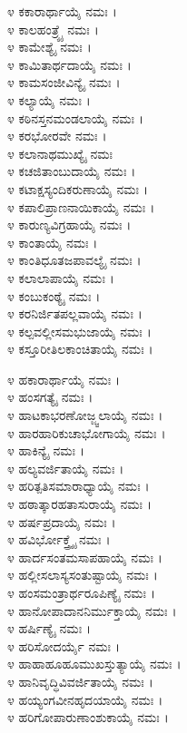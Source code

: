 
೪ ಕಕಾರಾರ್ಥಾಯೈ ನಮಃ ।\\
೪ ಕಾಲಹಂತ್ರ್ಯೈ ನಮಃ ।\\
೪ ಕಾಮೇಶ್ಯೈ ನಮಃ ।\\
೪ ಕಾಮಿತಾರ್ಥದಾಯೈ ನಮಃ ।\\
೪ ಕಾಮಸಂಜೀವಿನ್ಯೈ ನಮಃ ।\\
೪ ಕಲ್ಯಾಯೈ ನಮಃ ।\\
೪ ಕಠಿನಸ್ತನಮಂಡಲಾಯೈ ನಮಃ ।\\
೪ ಕರಭೋರವೇ ನಮಃ ।\\
೪ ಕಲಾನಾಥಮುಖ್ಯೈ ನಮಃ\\
೪ ಕಚಜಿತಾಂಬುದಾಯೈ ನಮಃ ।\\
೪ ಕಟಾಕ್ಷಸ್ಯಂದಿಕರುಣಾಯೈ ನಮಃ ।\\
೪ ಕಪಾಲಿಪ್ರಾಣನಾಯಿಕಾಯೈ ನಮಃ ।\\
೪ ಕಾರುಣ್ಯವಿಗ್ರಹಾಯೈ ನಮಃ ।\\
೪ ಕಾಂತಾಯೈ ನಮಃ ।\\
೪ ಕಾಂತಿಧೂತಜಪಾವಲ್ಯೈ ನಮಃ ।\\
೪ ಕಲಾಲಾಪಾಯೈ ನಮಃ ।\\
೪ ಕಂಬುಕಂಠ್ಯೈ ನಮಃ ।\\
೪ ಕರನಿರ್ಜಿತಪಲ್ಲವಾಯೈ ನಮಃ ।\\
೪ ಕಲ್ಪವಲ್ಲೀಸಮಭುಜಾಯೈ ನಮಃ ।\\
೪ ಕಸ್ತೂರೀತಿಲಕಾಂಚಿತಾಯೈ ನಮಃ ।


೪ ಹಕಾರಾರ್ಥಾಯೈ ನಮಃ ।\\
೪ ಹಂಸಗತ್ಯೈ ನಮಃ ।\\
೪ ಹಾಟಕಾಭರಣೋಜ್ಜ್ವಲಾಯೈ ನಮಃ ।\\
೪ ಹಾರಹಾರಿಕುಚಾಭೋಗಾಯೈ ನಮಃ ।\\
೪ ಹಾಕಿನ್ಯೈ ನಮಃ ।\\
೪ ಹಲ್ಯವರ್ಜಿತಾಯೈ ನಮಃ ।\\
೪ ಹರಿತ್ಪತಿಸಮಾರಾಧ್ಯಾಯೈ ನಮಃ ।\\
೪ ಹಠಾತ್ಕಾರಹತಾಸುರಾಯೈ ನಮಃ ।\\
೪ ಹರ್ಷಪ್ರದಾಯೈ ನಮಃ ।\\
೪ ಹವಿರ್ಭೋಕ್ತ್ರ್ಯೈ ನಮಃ ।\\
೪ ಹಾರ್ದಸಂತಮಸಾಪಹಾಯೈ ನಮಃ ।\\
೪ ಹಲ್ಲೀಸಲಾಸ್ಯಸಂತುಷ್ಟಾಯೈ ನಮಃ ।\\
೪ ಹಂಸಮಂತ್ರಾರ್ಥರೂಪಿಣ್ಯೈ ನಮಃ ।\\
೪ ಹಾನೋಪಾದಾನನಿರ್ಮುಕ್ತಾಯೈ ನಮಃ ।\\
೪ ಹರ್ಷಿಣ್ಯೈ ನಮಃ ।\\
೪ ಹರಿಸೋದರ್ಯೈ ನಮಃ ।\\
೪ ಹಾಹಾಹೂಹೂಮುಖಸ್ತುತ್ಯಾಯೈ ನಮಃ ।\\
೪ ಹಾನಿವೃದ್ಧಿವಿವರ್ಜಿತಾಯೈ ನಮಃ ।\\
೪ ಹಯ್ಯಂಗವೀನಹೃದಯಾಯೈ ನಮಃ ।\\
೪ ಹರಿಗೋಪಾರುಣಾಂಶುಕಾಯೈ ನಮಃ ।

